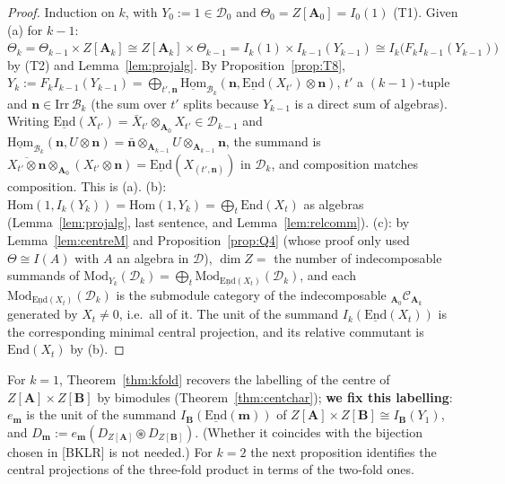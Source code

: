 \documentclass[11pt]{article}
\theoremstyle{definition}
\theoremstyle{remark}
\newcommand{\bfB}{\mathbf B}
\newcommand{\bfA}{\mathbf A}
\newcommand{\cfus}{\circledast}
\begin{document}
\begin{proof}
Induction on $k$, with $Y_0:=1\in\mathcal D_0$ and $\Theta_0=Z[\mathbf A_0]=I_0(1)$ (T1). Given (a) for $k-1$: $\Theta_k=\Theta_{k-1}\times Z[\mathbf A_k]\cong Z[\mathbf A_k]\times\Theta_{k-1}=I_k(1)\times I_{k-1}(Y_{k-1})\cong I_k\big(F_kI_{k-1}(Y_{k-1})\big)$ by (T2) and Lemma~\ref{lem:projalg}. By Proposition~\ref{prop:T8}, $Y_k:=F_kI_{k-1}(Y_{k-1})=\bigoplus_{t',\mathbf n}\underline{\mathrm{Hom}}_{\mathcal B_k}(\mathbf n,\underline{\mathrm{End}}(X_{t'})\otimes\mathbf n)$, $t'$ a $(k-1)$-tuple and $\mathbf n\in\mathrm{Irr}\,\mathcal B_k$ (the sum over $t'$ splits because $Y_{k-1}$ is a direct sum of algebras). Writing $\underline{\mathrm{End}}(X_{t'})=\bar X_{t'}\otimes_{\mathbf A_0}X_{t'}\in\mathcal D_{k-1}$ and $\underline{\mathrm{Hom}}_{\mathcal B_k}(\mathbf n,U\otimes\mathbf n)=\bar{\mathbf n}\otimes_{\mathbf A_{k-1}}U\otimes_{\mathbf A_{k-1}}\mathbf n$, the summand is $\overline{X_{t'}\otimes\mathbf n}\otimes_{\mathbf A_0}(X_{t'}\otimes\mathbf n)=\underline{\mathrm{End}}(X_{(t',\mathbf n)})$ in $\mathcal D_k$, and composition matches composition. This is (a). (b): $\mathrm{Hom}(1,I_k(Y_k))=\mathrm{Hom}(1,Y_k)=\bigoplus_t\mathrm{End}(X_t)$ as algebras (Lemma~\ref{lem:projalg}, last sentence, and Lemma~\ref{lem:relcomm}). (c): by Lemma~\ref{lem:centreM} and Proposition~\ref{prop:Q4} (whose proof only used $\Theta\cong I(A)$ with $A$ an algebra in $\mathcal D$), $\dim Z=$ the number of indecomposable summands of $\mathrm{Mod}_{Y_k}(\mathcal D_k)=\bigoplus_t\mathrm{Mod}_{\underline{\mathrm{End}}(X_t)}(\mathcal D_k)$, and each $\mathrm{Mod}_{\underline{\mathrm{End}}(X_t)}(\mathcal D_k)$ is the submodule category of the indecomposable ${}_{\mathbf A_0}\mathcal C_{\mathbf A_k}$ generated by $X_t\ne0$, i.e.\ all of it. The unit of the summand $I_k(\underline{\mathrm{End}}(X_t))$ is the corresponding minimal central projection, and its relative commutant is $\mathrm{End}(X_t)$ by (b).
\end{proof}

For $k=1$, Theorem~\ref{thm:kfold} recovers the labelling of the centre of $Z[\bfA]\times Z[\bfB]$ by bimodules (Theorem~\ref{thm:centchar}); \textbf{we fix this labelling}: $e_{\mathbf m}$ is the unit of the summand $I_{\bfB}(\underline{\mathrm{End}}(\mathbf m))$ of $Z[\bfA]\times Z[\bfB]\cong I_{\bfB}(Y_1)$, and $D_{\mathbf m}:=e_{\mathbf m}(D_{Z[\bfA]}\cfus D_{Z[\bfB]})$. (Whether it coincides with the bijection chosen in [BKLR] is not needed.) For $k=2$ the next proposition identifies the central projections of the three-fold product in terms of the two-fold ones.
\end{document}
